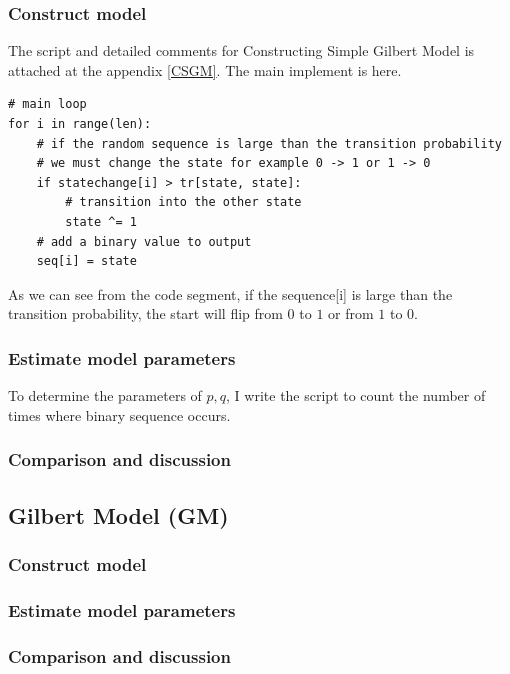 \documentclass[11pt]{article}
\begin{document}
\subsubsection{Construct model}
The script and detailed comments for Constructing Simple Gilbert Model is attached at the appendix \ref{CSGM}.
The main implement is here.
\begin{verbatim}
# main loop
for i in range(len):
    # if the random sequence is large than the transition probability
    # we must change the state for example 0 -> 1 or 1 -> 0
    if statechange[i] > tr[state, state]:
        # transition into the other state
        state ^= 1
    # add a binary value to output
    seq[i] = state
\end{verbatim}
As we can see from the code segment, if the sequence[i] is large than the transition probability, the start will flip from $0$ to $1$ or from $1$ to $0$.
\subsubsection{Estimate model parameters}
To determine the parameters of $p,q$, I write the script to count the number of times where binary sequence occurs.


\subsubsection{Comparison and discussion}

\subsection{Gilbert Model (GM)}
\subsubsection{Construct model}

\subsubsection{Estimate model parameters}


\subsubsection{Comparison and discussion}
\newpage
{}
\end{document}
